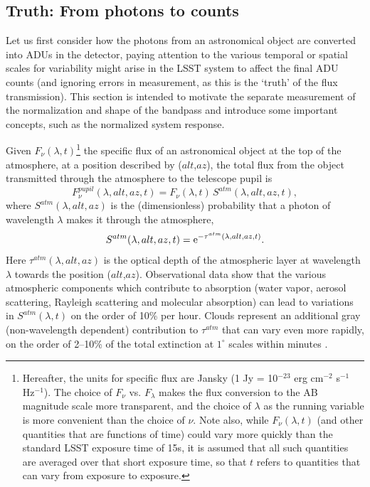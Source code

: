 \documentclass[12pt,preprint]{aastex}
\begin{document}
\subsection{Truth: From photons to counts}

Let us first consider how the photons from an astronomical object are
converted into ADUs in the detector, paying attention to the various
temporal or spatial scales for variability might arise in the LSST
system to affect the final ADU counts (and ignoring errors in
measurement, as this is the `truth' of the flux transmission). This section is intended
to motivate the separate measurement of the normalization and shape of
the bandpass and introduce some important concepts, such as the
normalized system response.

Given $F_\nu(\lambda, t)$\footnote{Hereafter, the units for specific
flux are Jansky (1 Jy = 10$^{-23}$ erg cm$^{-2}$ s$^{-1}$
Hz$^{-1}$). The choice of $F_\nu$ vs. $F_\lambda$ makes the flux
conversion to the AB magnitude scale more transparent, and the choice
of $\lambda$ as the running variable is more convenient than the
choice of $\nu$. Note also, while $F_\nu(\lambda,t)$ (and other
quantities that are functions of time) could vary more quickly than
the standard LSST exposure time of 15s, it is assumed that all such
quantities are averaged over that short exposure time, so that $t$
refers to quantities that can vary from exposure to exposure. }
the specific flux of an astronomical object at
the top of the atmosphere, at a position described by ($alt$,$az$),
the total flux from the object transmitted through the atmosphere to the telescope pupil is
\begin{equation}
\label{eqn:Fpupil}
   F_\nu^{pupil}(\lambda,alt,az,t) = F_\nu(\lambda, t) \, S^{atm}(\lambda,alt,az,t),
\end{equation}
where $S^{atm}(\lambda,alt,az)$ is the (dimensionless) probability that a photon of 
wavelength $\lambda$ makes it through the atmosphere,
\begin{equation}
\label{eqn:atmTau}
   S^{atm}(\lambda,alt,az,t)   = {\rm e}^{-\tau^{atm}(\lambda,alt,az,t)}.
\end{equation}
Here $\tau^{atm}(\lambda,alt,az)$ is the optical depth of the
atmospheric layer at wavelength $\lambda$ towards the position
($alt$,$az$). Observational data \citep{Stubbs2007b, Burke2010b} show
that the various atmospheric components which contribute to absorption
(water vapor, aerosol scattering, Rayleigh scattering and molecular
absorption) can lead to variations in $S^{atm}(\lambda,t)$ on the
order of 10\% per hour. Clouds represent an additional gray (non-wavelength
dependent) contribution to $\tau^{atm}$ that can vary even more
rapidly, on the order of 2--10\% of the total extinction at $1^{\circ}$
scales within minutes \citep{Ivezic2007}.
\end{document}
